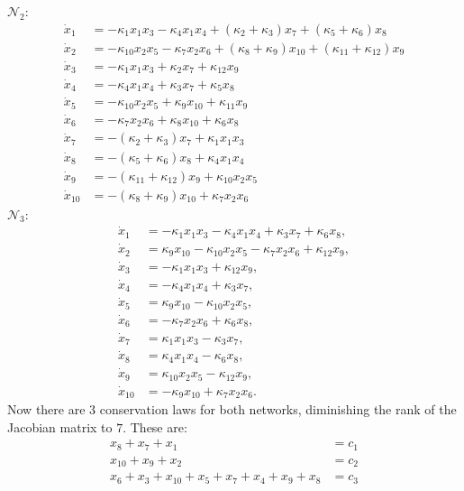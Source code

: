 $\mathcal{N}_2$:
\[
	\begin{aligned}
		\dot{x}_1&=-\kappa_{1}x_{1}x_{3}-\kappa_{4}x_{1}x_{4}+(\kappa_{2}+\kappa_{3})x_{7}+(\kappa_{5}+\kappa_{6})x_{8}\\\dot{x}_2&=-\kappa_{10}x_{2}x_{5}-\kappa_{7}x_{2}x_{6}+(\kappa_{8}+\kappa_{9})x_{10}+(\kappa_{11}+\kappa_{12})x_{9}\\\dot{x}_3&=-\kappa_1x_1x_3+\kappa_2x_7+\kappa_{12}x_9\\\dot{x}_4&=-\kappa_4x_1x_4+\kappa_3x_7+\kappa_5x_8\\\dot{x}_5&=-\kappa_{10}x_2x_5+\kappa_9x_{10}+\kappa_{11}x_9\\\dot{x}_6&=-\kappa_7x_2x_6+\kappa_8x_{10}+\kappa_6x_8\\\dot{x}_7&=-(\kappa_2+\kappa_3)x_7+\kappa_1x_1x_3\\\dot{x}_8&=-(\kappa_5+\kappa_6)x_8+\kappa_4x_1x_4\\\dot{x}_9&=-(\kappa_{11}+\kappa_{12})x_9+\kappa_{10}x_2x_5\\\dot{x}_{10}&=-(\kappa_8+\kappa_9)x_{10}+\kappa_7x_2x_6
	\end{aligned}
\]
$\mathcal{N}_3$:
\[
	\begin{aligned}
		\dot{x}_{1} &= -\kappa_{1} x_{1} x_{3} - \kappa_{4} x_{1} x_{4} + \kappa_{3} x_{7} + \kappa_{6} x_{8},\\
		\dot{x}_{2} &= \kappa_{9} x_{10} - \kappa_{10} x_{2} x_{5} - \kappa_{7} x_{2} x_{6} + \kappa_{12} x_{9},\\
		\dot{x}_{3} &= -\kappa_{1} x_{1} x_{3} + \kappa_{12} x_{9},\\
		\dot{x}_{4} &= -\kappa_{4} x_{1} x_{4} + \kappa_{3} x_{7},\\
		\dot{x}_{5} &= \kappa_{9} x_{10} - \kappa_{10} x_{2} x_{5},\\
		\dot{x}_{6} &= -\kappa_{7} x_{2} x_{6} + \kappa_{6} x_{8},\\
		\dot{x}_{7} &= \kappa_{1} x_{1} x_{3} - \kappa_{3} x_{7},\\
		\dot{x}_{8} &= \kappa_{4} x_{1} x_{4} - \kappa_{6} x_{8},\\
		\dot{x}_{9} &= \kappa_{10} x_{2} x_{5} - \kappa_{12} x_{9},\\
		\dot{x}_{10} &= -\kappa_{9} x_{10} + \kappa_{7} x_{2} x_{6}.
	\end{aligned}
\]
Now there are 3 conservation laws for both networks, diminishing the rank of the Jacobian matrix to $7$. These are:
\[
	\begin{aligned}
		x_{8}+x_{7}+x_{1} &=c_{1}\\
		x_{10}+x_{9}+x_{2}&=c_{2}\\
		x_6 + x_3 + x_{ 10 } + x_5 + x_7 + x_4 + x_9 + x_8 &= c_3
	\end{aligned}
\]
